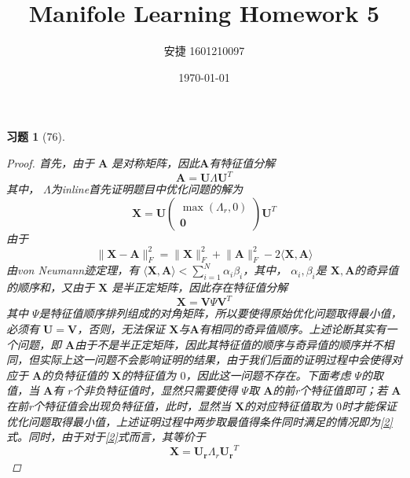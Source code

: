 \documentclass[a4paper, UTF8]{ctexart}
\title{Manifole Learning Homework 5}
\date{\today}
\author{安捷 1601210097}
\newtheorem*{exercise}{\textbf{习题}}
\begin{document}
\maketitle
  \begin{exercise}[76]
    \begin{proof}
      首先，由于 $\mathbf{A}$ 是对称矩阵，因此$\mathbf{A}$有特征值分解
      \begin{equation}
        \mathbf{A} = \mathbf{U} \Lambda \mathbf{U}^T
      \end{equation}
      其中， $\Lambda$为inline首先证明题目中优化问题的解为
      \begin{equation}\label{2}
        \mathbf{X} = \mathbf{U}
        \left( \begin{array}{c}
          \max \left( \Lambda_r, 0 \right) \\
          \mathbf{0}
        \end{array} \right)
        \mathbf{U}^T
      \end{equation}
      由于
      \begin{equation}
        \lVert \mathbf{X} - \mathbf{A} \rVert_F^2 = \lVert \mathbf{X} \rVert_F^2 + \lVert \mathbf{A} \rVert_F^2 - 2 \langle \mathbf{X}, \mathbf{A}\rangle
      \end{equation}
      由von Neumann迹定理，有 $\langle \mathbf{X}, \mathbf{A} \rangle < \sum_{i=1}^N \alpha_i \beta_i$，其中， $\alpha_i, \beta_i$是 $\mathbf{X},\mathbf{A}$的奇异值的顺序和，又由于 $\mathbf{X}$ 是半正定矩阵，因此存在特征值分解
      \begin{equation}
        \mathbf{X}=\mathbf{V} \Psi \mathbf{V}^T
      \end{equation}
      其中 $\Psi$是特征值顺序排列组成的对角矩阵，所以要使得原始优化问题取得最小值，必须有 $\mathbf{U} = \mathbf{V}$，否则，无法保证 $\mathbf{X}$与$\mathbf{A}$有相同的奇异值顺序。上述论断其实有一个问题，即 $\mathbf{A}$由于不是半正定矩阵，因此其特征值的顺序与奇异值的顺序并不相同，但实际上这一问题不会影响证明的结果，由于我们后面的证明过程中会使得对应于 $\mathbf{A}$的负特征值的 $\mathbf{X}$的特征值为 $0$，因此这一问题不存在。下面考虑 $\Psi$的取值，当 $\mathbf{A}$有 $r$个非负特征值时，显然只需要使得 $\Psi$取 $\mathbf{A}$的前r个特征值即可；若 $\mathbf{A}$ 在前r个特征值会出现负特征值，此时，显然当 $\mathbf{X}$的对应特征值取为 $0$时才能保证优化问题取得最小值，上述证明过程中两步取最值得条件同时满足的情况即为\ref{2}式。同时，由于对于\ref{2}式而言，其等价于
      \begin{equation}
        \mathbf{X} = \mathbf{U_r} \Lambda_r \mathbf{U_r}^T
      \end{equation}
    \end{proof}
  \end{exercise}
\end{document}
